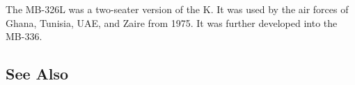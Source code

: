 The MB-326L was a two-seater version of the K. It was used by the air forces of Ghana, Tunisia, UAE, and Zaire from 1975. It was further developed into the MB-336.

\begin{adclist}
\end{adclist}

\subsection{See Also}
\begin{typelist}
\end{typelist}
